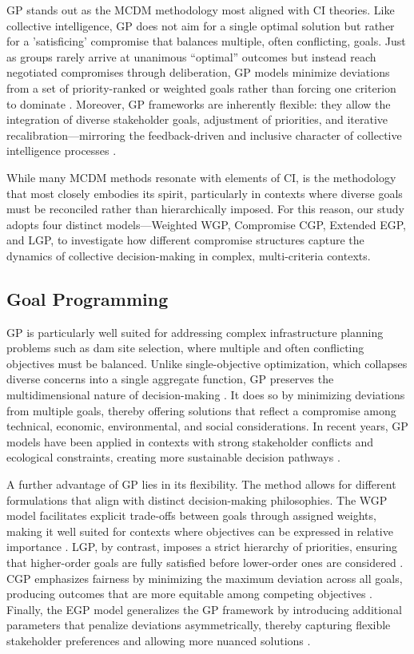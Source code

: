 \gls{GP} stands out as the MCDM methodology most aligned with CI theories. Like collective intelligence, \gls{GP} does not aim for a single optimal solution but rather for a 'satisficing' compromise that balances multiple, often conflicting, goals. Just as groups rarely arrive at unanimous “optimal” outcomes but instead reach negotiated compromises through deliberation, \gls{GP} models minimize deviations from a set of priority-ranked or weighted goals rather than forcing one criterion to dominate \cite{jones2010}. Moreover, \gls{GP} frameworks are inherently flexible: they allow the integration of diverse stakeholder goals, adjustment of priorities, and iterative recalibration—mirroring the feedback-driven and inclusive character of collective intelligence processes \cite{Borges2020}.

While many MCDM methods resonate with elements of CI,  is the methodology that most closely embodies its spirit, particularly in contexts where diverse goals must be reconciled rather than hierarchically imposed. For this reason, our study adopts four distinct  models—Weighted  \gls{WGP}, Compromise  \gls{CGP}, Extended  \gls{EGP}, and \gls{LGP}, to investigate how different compromise structures capture the dynamics of collective decision-making in complex, multi-criteria contexts.

\subsection{Goal Programming}
\gls{GP} is particularly well suited for addressing complex infrastructure planning problems such as dam site selection, where multiple and often conflicting objectives must be balanced. Unlike single-objective optimization, which collapses diverse concerns into a single aggregate function, \gls{GP} preserves the multidimensional nature of decision-making \cite{CHANG2007}. It does so by minimizing deviations from multiple goals, thereby offering solutions that reflect a compromise among technical, economic, environmental, and social considerations. In recent years, \gls{GP} models have been applied in contexts with strong stakeholder conflicts and ecological constraints, creating more sustainable decision pathways \cite{Castro2021}.

A further advantage of \gls{GP} lies in its flexibility. The method allows for different formulations that align with distinct decision-making philosophies. The \gls{WGP} model facilitates explicit trade-offs between goals through assigned weights, making it well suited for contexts where objectives can be expressed in relative importance \cite{JONES2011}. \gls{LGP}, by contrast, imposes a strict hierarchy of priorities, ensuring that higher-order goals are fully satisfied before lower-order ones are considered \cite{jones2010}. \gls{CGP} emphasizes fairness by minimizing the maximum deviation across all goals, producing outcomes that are more equitable among competing objectives \cite{jones2010}. Finally, the \gls{EGP} model generalizes the \gls{GP} framework by introducing additional parameters that penalize deviations asymmetrically, thereby capturing flexible stakeholder preferences and allowing more nuanced solutions \cite{jones2010}.

